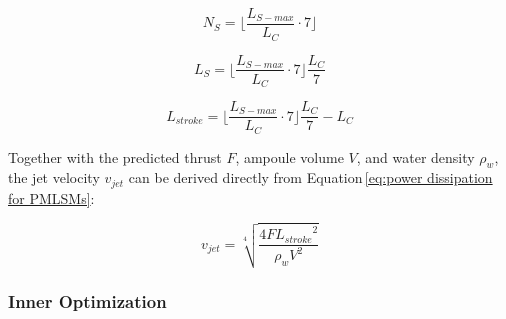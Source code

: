                 \begin{equation}
                    N_S = \bigg\lfloor  \frac{L_{S-max}}{L_C} \cdot 7 \bigg\rfloor
                    \label{eq:max mumber of teeth for LFSM stator}
                \end{equation}
                
                
                \begin{equation}
                    L_S = {\bigg\lfloor  \frac{L_{S-max}}{L_C} \cdot 7 \bigg\rfloor} \frac{L_C}{7}
                    \label{eq:possible stator length LFSM stator}
                \end{equation}
                
                
                \begin{equation}
                    L_{stroke} = {\bigg\lfloor  \frac{L_{S-max}}{L_C} \cdot 7 \bigg\rfloor} \frac{L_C}{7} - L_C
                    \label{eq:possible stroke length LFSM stator}
                \end{equation}
                
                
                Together with the predicted thrust $F$, ampoule volume $V$, and water density $\rho_w$, the jet velocity $v_{jet}$ can be derived directly from Equation\,\ref{eq:power dissipation for PMLSMs}:
            
            
                \begin{equation}
                    v_{jet} = \sqrt[4]{\frac{4 F {L_{stroke}}^2}{\rho_w V^2}}
                    \label{eq:v_jet for FSM}
                \end{equation}
                
                
            \subsubsection{Inner Optimization}          \label{Chapter:RSM/LFSM/Optimization/Inner}
                
